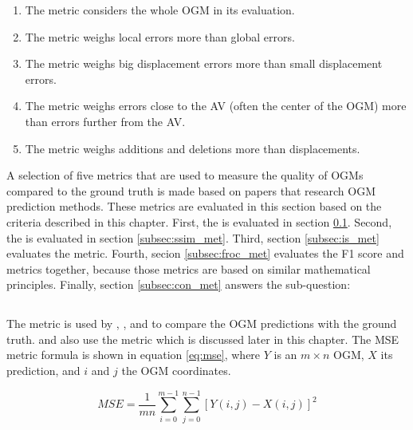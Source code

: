 \begin{enumerate}
	\item The metric considers the whole \gls{OGM} in its evaluation.
	\item The metric weighs local errors more than global errors.
	\item The metric weighs big displacement errors more than small displacement errors. 
	\item The metric weighs errors close to the \gls{AV} (often the center of the \gls{OGM}) more than errors further from the \gls{AV}.
	\item The metric weighs additions and deletions more than displacements.
\end{enumerate}

A selection of five metrics that are used to measure the quality of \glspl{OGM} compared to the ground truth is made based on papers that research \gls{OGM} prediction methods. These metrics are evaluated in this section based on the criteria described in this chapter. First, the  is evaluated in section \ref{subsec:mse_met}. Second, the  is evaluated in section \ref{subsec:ssim_met}. Third, section \ref{subsec:is_met} evaluates the  metric. Fourth, secion \ref{subsec:froc_met} evaluates the F1 score and  metrics together, because those metrics are based on similar mathematical principles. Finally, section \ref{subsec:con_met} answers the sub-question: 

\subsection{} \label{subsec:mse_met}
The  metric is used by \cite{itkina2019dynamic}, \cite{lange2020attention}, and \cite{toyungyernsub2020double} to compare the \gls{OGM} predictions with the ground truth. \cite{lange2020attention} and \cite{toyungyernsub2020double} also use the  metric which is discussed later in this chapter. The \gls{MSE} metric formula is shown in equation \ref{eq:mse}, where $Y$ is an $m \times n$ \gls{OGM}, $X$ its prediction, and $i$ and $j$ the \gls{OGM} coordinates.

\begin{equation} \label{eq:mse}
	MSE = \frac{1}{mn}\sum_{i=0}^{m-1}\sum_{j=0}^{n-1}[Y(i,j)-X(i,j)]^2
\end{equation}

